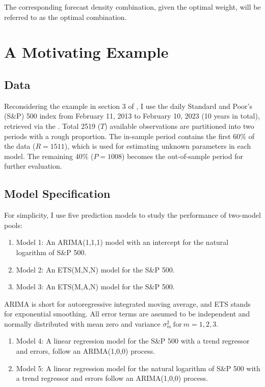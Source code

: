 \documentclass{monashthesis}
\begin{document}
The corresponding forecast density combination, given the optimal weight, will be referred to as the optimal combination.

\hypertarget{a-motivating-example}{%
\section{A Motivating Example}\label{a-motivating-example}}

\hypertarget{data}{%
\subsection{Data}\label{data}}

Reconsidering the example in section 3 of \textcite{GA11}, I use the daily Standard and Poor's (S\&P) 500 index from February 11, 2013 to February 10, 2023 (10 years in total), retrieved via the \textcite{SP500}. Total 2519 (\(T\)) available observations are partitioned into two periods with a rough proportion. The in-sample period contains the first 60\% of the data (\(R = 1511\)), which is used for estimating unknown parameters in each model. The remaining 40\% (\(P = 1008\)) becomes the out-of-sample period for further evaluation.

\hypertarget{model}{%
\subsection{Model Specification}\label{model}}

For simplicity, I use five prediction models to study the performance of two-model pools:

\begin{enumerate}
\def\labelenumi{\arabic{enumi}.}
\tightlist
\item
  Model 1: An ARIMA(1,1,1) model with an intercept for the natural logarithm of S\&P 500.
\item
  Model 2: An ETS(M,N,N) model for the S\&P 500.
\item
  Model 3: An ETS(M,A,N) model for the S\&P 500.
\end{enumerate}

ARIMA is short for autoregressive integrated moving average, and ETS stands for exponential smoothing. All error terms are assumed to be independent and normally distributed with mean zero and variance \(\sigma_m^2 \ \text{for}\  m = 1,2,3\).

\begin{enumerate}
\def\labelenumi{\arabic{enumi}.}
\setcounter{enumi}{3}
\tightlist
\item
  Model 4: A linear regression model for the S\&P 500 with a trend regressor and errors, follow an ARIMA(1,0,0) process.
\item
  Model 5: A linear regression model for the natural logarithm of S\&P 500 with a trend regressor and errors follow an ARIMA(1,0,0) process.
\end{enumerate}
\end{document}
